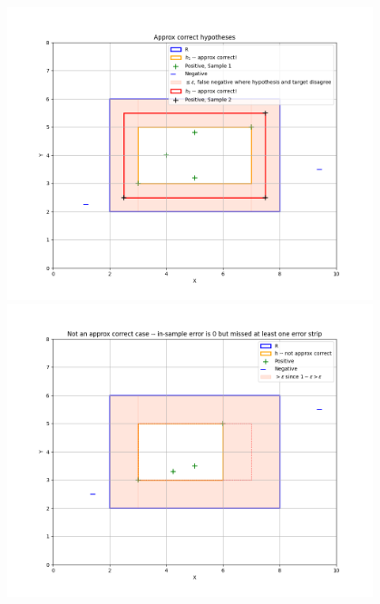 \centering
\includegraphics[width=0.8\textwidth]{./chapters/goodPAC.png}
\includegraphics[width=0.8\textwidth]{./chapters/badPAC.png}